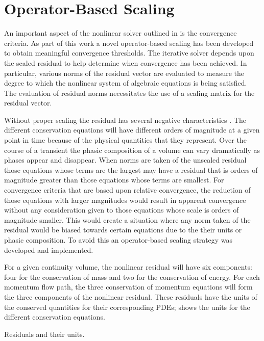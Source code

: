 \section{Operator-Based Scaling}
\label{sect:nlnScaling}

An important aspect of the nonlinear solver outlined in  is the convergence criteria.
As part of this work a novel operator-based scaling has been developed to obtain meaningful convergence thresholds.
The iterative solver depends upon the scaled residual to help determine when convergence has been achieved.
In particular, various norms of the residual vector are evaluated to measure the degree to which the nonlinear system of algebraic equations is being satisfied.
The evaluation of residual norms necessitates the use of a scaling matrix for the residual vector.

Without proper scaling the residual has several negative characteristics \cite{Frepoli2003, McHugh1995}.
The different conservation equations will have different orders of magnitude at a given point in time because of the physical quantities that they represent.
Over the course of a transient the phasic composition of a volume can vary dramatically as phases appear and disappear.
When norms are taken of the unscaled residual those equations whose terms are the largest may have a residual that is orders of magnitude greater than those equations whose terms are smallest.
For convergence criteria that are based upon relative convergence, the reduction of those equations with larger magnitudes would result in apparent convergence without any consideration given to those equations whose scale is orders of magnitude smaller.
This would create a situation where any norm taken of the residual would be biased towards certain equations due to the their units or phasic composition.
To avoid this an operator-based scaling strategy was developed and implemented.

For a given continuity volume, the nonlinear residual will have six components: four for the conservation of mass and two for the conservation of energy.
For each momentum flow path, the three conservation of momentum equations will form the three components of the nonlinear residual.
These residuals have the units of the conserved quantities for their corresponding PDEs;  shows the units for the different conservation equations.

\begin{table}[ht!]
\centering
\singlespace

\caption{Residuals and their units.}
\label{tab:scaling_units_scales}
\end{table}

